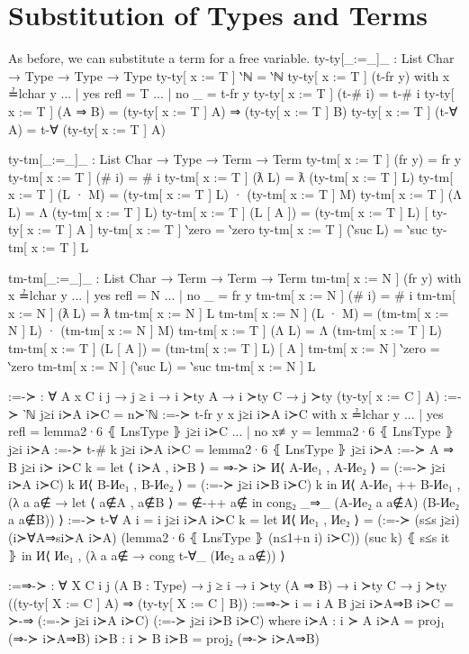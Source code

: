 \documentclass[logo,bsc,singlespacing,parskip,online]{infthesis}
\renewenvironment{code}{\mintedcopy[breaklines,breaksymbolleft=\;]{agda}}{\endmintedcopy}
\begin{document}
\section{Substitution of Types and Terms}
As before, we can substitute a term for a free variable.
\begin{code}
  ty-ty[_:=_]_ : List Char → Type → Type → Type
  ty-ty[ x := T ] ‵ℕ = ‵ℕ
  ty-ty[ x := T ] (t-fr y) with x ≟lchar y
  ... | yes refl = T
  ... | no  _    = t-fr y
  ty-ty[ x := T ] (t-# i) = t-# i
  ty-ty[ x := T ] (A ⇒ B) = (ty-ty[ x := T ] A) ⇒ (ty-ty[ x := T ] B)
  ty-ty[ x := T ] (t-∀ A) = t-∀ (ty-ty[ x := T ] A)

  ty-tm[_:=_]_ : List Char → Type → Term → Term
  ty-tm[ x := T ] (fr y) = fr y
  ty-tm[ x := T ] (# i) = # i
  ty-tm[ x := T ] (ƛ L) = ƛ (ty-tm[ x := T ] L)
  ty-tm[ x := T ] (L · M) = (ty-tm[ x := T ] L) · (ty-tm[ x := T ] M)
  ty-tm[ x := T ] (Λ L) = Λ (ty-tm[ x := T ] L)
  ty-tm[ x := T ] (L [ A ]) = (ty-tm[ x := T ] L) [ ty-ty[ x := T ] A ]
  ty-tm[ x := T ] ‵zero = ‵zero
  ty-tm[ x := T ] (‵suc L) = ‵suc ty-tm[ x := T ] L

  tm-tm[_:=_]_ : List Char → Term → Term → Term
  tm-tm[ x := N ] (fr y) with x ≟lchar y
  ... | yes refl = N
  ... | no  _    = fr y
  tm-tm[ x := N ] (# i) = # i
  tm-tm[ x := N ] (ƛ L) = ƛ tm-tm[ x := N ] L
  tm-tm[ x := N ] (L · M) = (tm-tm[ x := N ] L) · (tm-tm[ x := N ] M)
  tm-tm[ x := T ] (Λ L) = Λ (tm-tm[ x := T ] L)
  tm-tm[ x := T ] (L [ A ]) = (tm-tm[ x := T ] L) [ A ]
  tm-tm[ x := N ] ‵zero = ‵zero
  tm-tm[ x := N ] (‵suc L) = ‵suc tm-tm[ x := N ] L

  :=-≻ : ∀ {A x C i j} → j ≥ i → i ≻ty A → i ≻ty C → j ≻ty (ty-ty[ x := C ] A)
  :=-≻ {‵ℕ} j≥i i≻A i≻C = n≻‵ℕ
  :=-≻ {t-fr y} {x} j≥i i≻A i≻C with x ≟lchar y
  ... | yes refl = lemma2·6 ⦃ LnsType ⦄ j≥i i≻C
  ... | no  x≢y  = lemma2·6 ⦃ LnsType ⦄ j≥i i≻A
  :=-≻ {t-# k} j≥i i≻A i≻C = lemma2·6 ⦃ LnsType ⦄ j≥i i≻A
  :=-≻ {A ⇒ B} j≥i i≻ i≻C k =
    let ⟨ i≻A , i≻B ⟩ = ⇒-≻ i≻
        И⟨ A-Иe₁ , A-Иe₂ ⟩ = (:=-≻ j≥i i≻A i≻C) k
        И⟨ B-Иe₁ , B-Иe₂ ⟩ = (:=-≻ j≥i i≻B i≻C) k
    in И⟨ A-Иe₁ ++ B-Иe₁ , (λ a {a∉} →
      let ⟨ a∉A , a∉B ⟩ = ∉-++ a∉
      in cong₂ _⇒_ (A-Иe₂ a {a∉A}) (B-Иe₂ a {a∉B})) ⟩
  :=-≻ {t-∀ A} {i = i}  j≥i i≻A i≻C k =
    let И⟨ Иe₁ , Иe₂ ⟩ = (:=-≻ (s≤s j≥i) (i≻∀A⇒si≻A i≻A) (lemma2·6 ⦃ LnsType ⦄ (n≤1+n i) i≻C)) (suc k) ⦃ s≤s it ⦄
    in И⟨ Иe₁ , (λ a {a∉} → cong t-∀_ (Иe₂ a {a∉})) ⟩

  :=⇒-≻ : ∀ {X C i j} (A B : Type) → j ≥ i → i ≻ty (A ⇒ B) → i ≻ty C → j ≻ty ((ty-ty[ X := C ] A) ⇒ (ty-ty[ X := C ] B))
  :=⇒-≻ {i = i} A B j≥i i≻A⇒B i≻C = ≻-⇒ (:=-≻ j≥i i≻A i≻C) (:=-≻ j≥i i≻B i≻C)
    where
      i≻A : i ≻ A
      i≻A = proj₁ (⇒-≻ i≻A⇒B)
      i≻B : i ≻ B
      i≻B = proj₂ (⇒-≻ i≻A⇒B)


\end{code}
\end{document}
